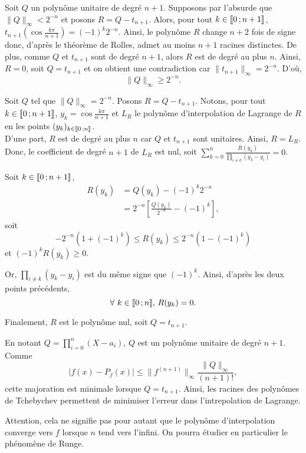 \begin{solution}
\begin{questions}
\item Soit $Q$ un polynôme unitaire de degré $n+1$. Supposons par l'absurde que $\|Q\|_\infty < 2^{-n}$ et posons $R = Q - t_{n+1}$. Alors, pour tout $k \in \llbracket 0\,; n+1 \rrbracket$, $t_{n+1}(\cos \frac{k\pi}{n+1}) = (-1)^k 2^{-n}$. Ainsi, le polynôme $R$ change $n+2$ fois de signe donc, d'après le théorème de Rolles, admet au moins $n+1$ racines distinctes. De plus, comme $Q$ et $t_{n+1}$ sont de degré $n+1$, alors $R$ est de degré au plus $n$. Ainsi, $R = 0$, soit $Q = t_{n+1}$ et on obtient une contradiction car $\|t_{n+1}\|_\infty = 2^{-n}$. D'où,
{
\[\|Q\|_\infty \geq 2^{-n}.\]
}

Soit $Q$ tel que $\|Q\|_\infty = 2^{-n}$. Posons $R = Q - t_{n+1}$. Notons, pour tout $k \in \llbracket 0\,; n+1 \rrbracket$, $y_k = \cos \frac{k\pi}{n+1}$ et $L_R$ le polynôme d'interpolation de Lagrange de $R$ en les points $(y_k)_{k\in\llbracket 0\,; n \rrbracket}$. \\
D'une part, $R$ est de degré au plus $n$ car $Q$ et $t_{n+1}$ sont unitaires. Ainsi, $R = L_R$. Donc, le coefficient de degré $n+1$ de $L_R$ est nul, soit $\sum_{k=0}^n \frac{R(y_k)}{\prod_{i\neq k} (y_k-y_i)} = 0$.

Soit $k \in \llbracket 0\,; n+1 \rrbracket$,
\begin{align*}
R(y_k) &= Q(y_k) - (-1)^k 2^{-n} \\
&= 2^{-n} \left[\frac{Q(y_k)}{2^{-n}} - (-1)^k\right],
\end{align*}
soit
\[
-2^{-n} (1 + (-1)^k) \leq R(y_k) \leq 2^{-n} (1 - (-1)^k)
\]
et $(-1)^k R(y_k) \geq 0$.

Or, $\prod_{i\neq k} (y_k-y_i)$ est du même signe que $(-1)^k$. Ainsi, d'après les deux points précédents,
\[
\forall\, k \in \interent{0}{n},\, R(y_k) = 0.
\]

Finalement, $R$ est le polynôme nul, soit
{
$Q = t_{n+1}$.
}

\item En notant $Q = \prod_{i=0}^n (X-a_i)$, $Q$ est un polynôme unitaire de degré $n+1$. Comme
\[
|f(x) - P_f(x)| \leq \|f^{(n+1)}\|_\infty \frac{\|Q\|_\infty}{(n+1)!},
\]
cette majoration est minimale lorsque $Q = t_{n+1}$. Ainsi, les racines des polynômes de Tchebychev permettent de minimiser l'erreur dans l'intrepolation de Lagrange.

Attention, cela ne signifie pas pour autant que le polynôme d'interpolation converge vers $f$ lorsque $n$ tend vers l'infini. On pourra étudier en particulier le phénomène de Runge.
\end{questions}
\end{solution}